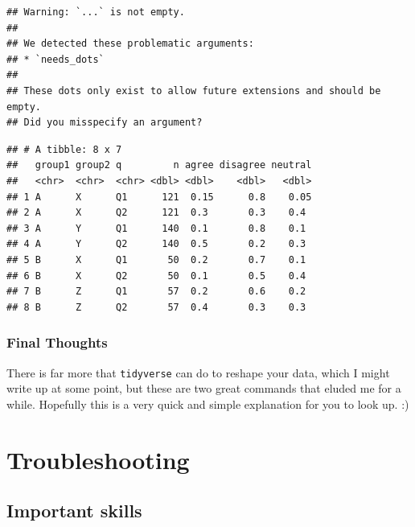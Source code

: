 \documentclass[
]{book}
\newenvironment{Shaded}{\begin{snugshade}}{\end{snugshade}}
\newcommand{\DataTypeTok}[1]{\textcolor[rgb]{0.13,0.29,0.53}{#1}}
\newcommand{\KeywordTok}[1]{\textcolor[rgb]{0.13,0.29,0.53}{\textbf{#1}}}
\newcommand{\NormalTok}[1]{#1}
\newcommand{\OperatorTok}[1]{\textcolor[rgb]{0.81,0.36,0.00}{\textbf{#1}}}
\newcommand{\StringTok}[1]{\textcolor[rgb]{0.31,0.60,0.02}{#1}}
\begin{document}
\begin{Shaded}
\end{Shaded}

\begin{verbatim}
## Warning: `...` is not empty.
## 
## We detected these problematic arguments:
## * `needs_dots`
## 
## These dots only exist to allow future extensions and should be empty.
## Did you misspecify an argument?
\end{verbatim}

\begin{verbatim}
## # A tibble: 8 x 7
##   group1 group2 q         n agree disagree neutral
##   <chr>  <chr>  <chr> <dbl> <dbl>    <dbl>   <dbl>
## 1 A      X      Q1      121  0.15      0.8    0.05
## 2 A      X      Q2      121  0.3       0.3    0.4 
## 3 A      Y      Q1      140  0.1       0.8    0.1 
## 4 A      Y      Q2      140  0.5       0.2    0.3 
## 5 B      X      Q1       50  0.2       0.7    0.1 
## 6 B      X      Q2       50  0.1       0.5    0.4 
## 7 B      Z      Q1       57  0.2       0.6    0.2 
## 8 B      Z      Q2       57  0.4       0.3    0.3
\end{verbatim}

\hypertarget{final-thoughts}{%
\subsection{Final Thoughts}\label{final-thoughts}}

There is far more that \texttt{tidyverse} can do to reshape your data, which I might write up at some point, but these are two great commands that eluded me for a while. Hopefully this is a very quick and simple explanation for you to look up. :)

\hypertarget{trouble}{%
\chapter{Troubleshooting}\label{trouble}}

\hypertarget{important-skills}{%
\section{Important skills}\label{important-skills}}
\end{document}
